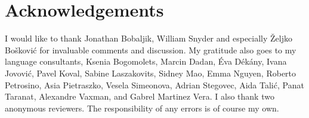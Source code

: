 \documentclass[output=paper]{langscibook}
\begin{document}
\section*{Acknowledgements}
I would like to thank Jonathan Bobaljik, William Snyder and especially Željko Bošković for invaluable comments and discussion. My gratitude also goes to my language consultants, Ksenia Bogomolets, Marcin Dadan, Éva Dékány, Ivana Jovović, Pavel Koval, Sabine Laszakovits, Sidney Mao, Emma Nguyen, Roberto Petrosino, Asia Pietraszko, Vesela Simeonova, Adrian Stegovec, Aida Talić, Panat Taranat, Alexandre Vaxman, and Gabrel Martinez Vera. I also thank two anonymous reviewers. The responsibility of any errors is of course my own.

\printbibliography[heading=subbibliography,notkeyword=this]
\end{document}

